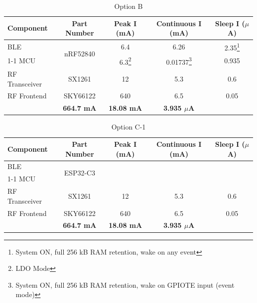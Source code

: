 \documentclass{article}
\begin{document}
\begin{table}[h]
\begin{minipage}{\textwidth}
\centering
\caption*{Option B}
\begin{tabular}{|l|c|c|c|c|}
\hline
\textbf{Component} & \textbf{Part Number} & \textbf{Peak I (mA)} & \textbf{Continuous I (mA)} & \textbf{Sleep I ($\mu$A)} \\
\hline
BLE & \multirow{2}{*}{nRF52840} & 6.4 & 6.26 & 2.35\footnote{System ON, full 256 kB RAM retention, wake on any event} \\
\cline{1-1}\cline{3-5}
MCU &  & 6.3\footnote{LDO Mode} & 0.01737\footnote{System ON, full 256 kB RAM retention, wake on GPIOTE input (event mode)} & 0.935 \\
\hline
RF Transceiver & SX1261 & 12 & 5.3 & 0.6 \\
\hline
RF Frontend & SKY66122 & 640 & 6.5 & 0.05 \\
\Xhline{5\arrayrulewidth}
\multicolumn{2}{|c|}{\textbf{Total}} & \textbf{664.7 mA} & \textbf{18.08 mA} & \textbf{3.935 $\mu$A} \\
\hline

\end{tabular}
\end{minipage}
\end{table}

\begin{table}[h]
\begin{minipage}{\textwidth}
\centering
\caption*{Option C-1}
\begin{tabular}{|l|c|c|c|c|}
\hline
\textbf{Component} & \textbf{Part Number} & \textbf{Peak I (mA)} & \textbf{Continuous I (mA)} & \textbf{Sleep I ($\mu$A)} \\
\hline
BLE & \multirow{2}{*}{ESP32-C3} & & &  \\
\cline{1-1}\cline{3-5}
MCU &  &  &  &  \\
\hline
RF Transceiver & SX1261 & 12 & 5.3 & 0.6 \\
\hline
RF Frontend & SKY66122 & 640 & 6.5 & 0.05 \\
\Xhline{5\arrayrulewidth}
\multicolumn{2}{|c|}{\textbf{Total}} & \textbf{664.7 mA} & \textbf{18.08 mA} & \textbf{3.935 $\mu$A} \\
\hline

\end{tabular}
\end{minipage}
\end{table}
\end{document}
